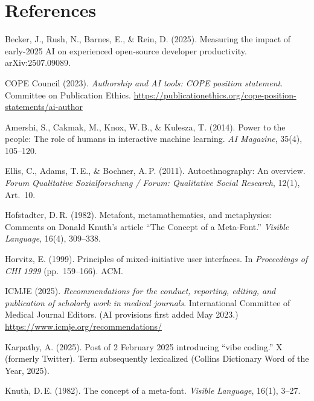 \documentclass[12pt]{article}
\begin{document}
\section*{References}
\begin{list}{}{\setlength{\itemindent}{-2em}\setlength{\leftmargin}{2em}\setlength{\itemsep}{2pt}}

\item Becker, J., Rush, N., Barnes, E., \& Rein, D. (2025). Measuring the impact of early-2025 AI on experienced open-source developer productivity. arXiv:2507.09089.

\item COPE Council (2023). \emph{Authorship and AI tools: COPE position statement}. Committee on Publication Ethics. \url{https://publicationethics.org/cope-position-statements/ai-author}

\item Amershi, S., Cakmak, M., Knox, W.\,B., \& Kulesza, T. (2014). Power to the people: The role of humans in interactive machine learning. \emph{AI Magazine}, 35(4), 105--120.

\item Ellis, C., Adams, T.\,E., \& Bochner, A.\,P. (2011). Autoethnography: An overview. \emph{Forum Qualitative Sozialforschung / Forum: Qualitative Social Research}, 12(1), Art.\ 10.

\item Hofstadter, D.\,R. (1982). Metafont, metamathematics, and metaphysics: Comments on Donald Knuth's article ``The Concept of a Meta-Font.'' \emph{Visible Language}, 16(4), 309--338.

\item Horvitz, E. (1999). Principles of mixed-initiative user interfaces. In \emph{Proceedings of CHI 1999} (pp.\ 159--166). ACM.

\item ICMJE (2025). \emph{Recommendations for the conduct, reporting, editing, and publication of scholarly work in medical journals}. International Committee of Medical Journal Editors. (AI provisions first added May 2023.) \url{https://www.icmje.org/recommendations/}

\item Karpathy, A. (2025). Post of 2 February 2025 introducing ``vibe coding.'' X (formerly Twitter). Term subsequently lexicalized (Collins Dictionary Word of the Year, 2025).

\item Knuth, D.\,E. (1982). The concept of a meta-font. \emph{Visible Language}, 16(1), 3--27.


\end{list}
\end{document}

